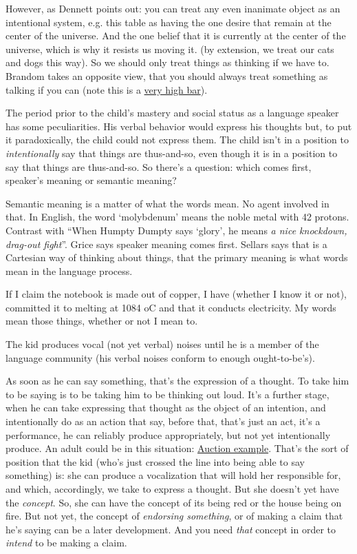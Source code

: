 However, as Dennett points out: you can treat any even inanimate object as an intentional system, e.g. this table as having the one desire that remain at the center of the universe. And the one belief that it is currently at the center of the universe, which is why it resists us moving it. (by extension, we treat our cats and dogs this way). So we should only treat things as thinking if we have to. Brandom takes an opposite view, that you should always treat something as talking if you can (note this is a \href{doc/phil/Phil Situations/Novel sentence|Used as example}{very high bar}).



The period prior to the child's mastery and social status as a language speaker has some peculiarities. His verbal behavior would express his thoughts but, to put it paradoxically, the child could not express them. The child isn't in a position to \emph{intentionally} say that things are thus-and-so, even though it is in a position to say that things are thus-and-so. So there's a question: which comes first, speaker's meaning or semantic meaning?

Semantic meaning is a matter of what the words mean. No agent involved in that. In English, the word `molybdenum' means the noble metal with 42 protons. Contrast with ``When Humpty Dumpty says `glory', he means \emph{a nice knockdown, drag-out fight}''. Grice says speaker meaning comes first. Sellars says that is a Cartesian way of thinking about things, that the primary meaning is what words mean in the language process.

If I claim the notebook is made out of copper, I have (whether I know it or not), committed it to melting at 1084 oC and that it conducts electricity. My words mean those things, whether or not I mean to.

The kid produces vocal (not yet verbal) noises until he is a member of the language community (his verbal noises conform to enough ought-to-be's).

As soon as he can say something, that's the expression of a thought. To take him to be saying is to be taking him to be thinking out loud. It's a further stage, when he can take expressing that thought as the object of an intention, and intentionally do as an action that say, before that, that's just an act, it's a performance, he can reliably produce appropriately, but not yet intentionally produce. An adult could be in this situation: \href{doc/phil/Phil Situations/Auction}{Auction example}. That's the sort of position that the kid (who's just crossed the line into being able to say something) is: she can produce a vocalization that will hold her responsible for, and which, accordingly, we take to express a thought. But she doesn't yet have the \emph{concept}. So, she can have the concept of its being red or the house being on fire. But not yet, the concept of \emph{endorsing something}, or of making a claim that he's saying can be a later development. And you need \emph{that} concept in order to \emph{intend} to be making a claim.

